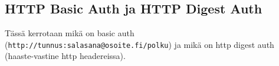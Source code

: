 \documentclass[finnish,gradu]{tktltiki}
\begin{document}



  \subsection{HTTP Basic Auth ja HTTP Digest Auth} %
  \label{sub:http_basic_auth_ja_http_digest_auth}
  Tässä kerrotaan mikä on basic auth (\verb!http://tunnus:salasana@osoite.fi/polku!) ja mikä on http digest auth (haaste-vastine http headereissa).





\end{document}
